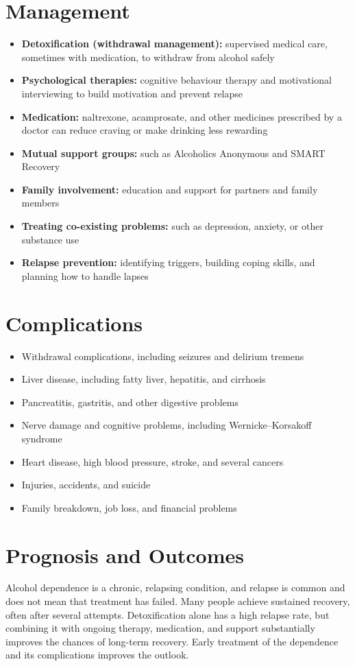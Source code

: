 \section*{Management}
\begin{itemize}
    \item \textbf{Detoxification (withdrawal management):} supervised medical care, sometimes with medication, to withdraw from alcohol safely
    \item \textbf{Psychological therapies:} cognitive behaviour therapy and motivational interviewing to build motivation and prevent relapse
    \item \textbf{Medication:} naltrexone, acamprosate, and other medicines prescribed by a doctor can reduce craving or make drinking less rewarding
    \item \textbf{Mutual support groups:} such as Alcoholics Anonymous and SMART Recovery
    \item \textbf{Family involvement:} education and support for partners and family members
    \item \textbf{Treating co-existing problems:} such as depression, anxiety, or other substance use
    \item \textbf{Relapse prevention:} identifying triggers, building coping skills, and planning how to handle lapses
\end{itemize}

\section*{Complications}
\begin{itemize}
    \item Withdrawal complications, including seizures and delirium tremens
    \item Liver disease, including fatty liver, hepatitis, and cirrhosis
    \item Pancreatitis, gastritis, and other digestive problems
    \item Nerve damage and cognitive problems, including Wernicke--Korsakoff syndrome
    \item Heart disease, high blood pressure, stroke, and several cancers
    \item Injuries, accidents, and suicide
    \item Family breakdown, job loss, and financial problems
\end{itemize}

\section*{Prognosis and Outcomes}
Alcohol dependence is a chronic, relapsing condition, and relapse is common and does not mean that treatment has failed. Many people achieve sustained recovery, often after several attempts. Detoxification alone has a high relapse rate, but combining it with ongoing therapy, medication, and support substantially improves the chances of long-term recovery. Early treatment of the dependence and its complications improves the outlook.

